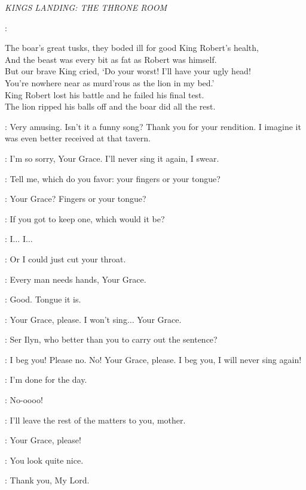 \scene

\textit{KINGS LANDING: THE THRONE ROOM} 

\MARILLION:  

The boar's great tusks, they boded ill for good King Robert's health,\\
And the beast was every bit as fat as Robert was himself.\\
But our brave King cried, `Do your worst! I'll have your ugly head! \\
You're nowhere near as murd'rous as  the lion in my bed.' \\
King Robert lost his battle and  he failed his final test.  \\
The lion ripped his balls off and the boar did all the rest.

\JOFFREY: Very amusing. Isn't it a funny song? Thank you for your rendition. I imagine it was even better received at that tavern. 

\MARILLION: I'm so sorry, Your Grace. I'll never sing it again, I swear. 

\JOFFREY: Tell me, which do you favor: your fingers or your tongue? 

\MARILLION: Your Grace? Fingers or your tongue? 

\JOFFREY: If you got to keep one, which would it be? 

\MARILLION: I$\ldots$ I$\ldots$  

\JOFFREY: Or I could just cut your throat. 

\MARILLION: Every man needs hands, Your Grace. 

\JOFFREY: Good. Tongue it is. 

\MARILLION: Your Grace, please. I won't sing$\ldots$ Your Grace. 

\JOFFREY: Ser Ilyn, who better than you to carry out the sentence? 


\MARILLION: I beg you! Please no. No! Your Grace, please. I beg you, I will never sing again! 

\JOFFREY: I'm done for the day. 

\MARILLION: No-oooo! 

\JOFFREY: I'll leave the rest of the matters to you, mother. 

\MARILLION: Your Grace, please! 

\JOFFREY: You look quite nice. 

\SANSA: Thank you, My Lord. 

